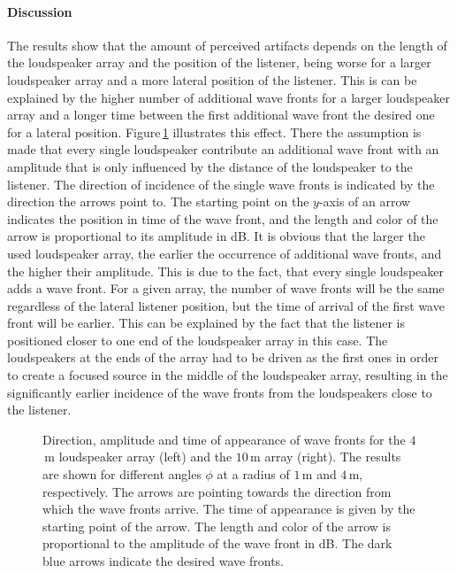 \paragraph{Discussion}
The results show that the amount of perceived artifacts depends on the length of
the loudspeaker array and the position of the listener, being worse for a larger
loudspeaker array and a more lateral position of the listener. This is can be
explained by the higher number of additional wave fronts for a larger
loudspeaker array and a longer time between the first additional wave front the
desired one for a lateral position. Figure\,\ref{fig:fs_direction} illustrates
this effect. There the assumption is made that every single loudspeaker
contribute an additional wave front with an amplitude that is only influenced by
the distance of the loudspeaker to the listener. The direction of incidence of
the single wave fronts is indicated by the direction the arrows point to.
The starting point on the $y$-axis of an arrow indicates the position in time
of the wave front, and the length and color of the arrow is proportional to
its amplitude in dB.
It is obvious that the larger the used
loudspeaker array, the earlier the occurrence of additional wave fronts, and the
higher their amplitude. This is due to the fact, that every single loudspeaker
adds a wave front.  For a given array, the number of wave fronts will be the
same regardless of the lateral listener position, but the time of arrival of the
first wave front will be earlier. This can be explained by the fact that the
listener is positioned closer to one end of the loudspeaker array in this case.
The loudspeakers at the ends of the array had to be driven as the first ones in
order to create a focused source in the middle of the loudspeaker array,
resulting in the significantly earlier incidence of the wave fronts from the
loudspeakers close to the listener.

\begin{figure}
    \centering
    \small
    
    \caption{Direction, amplitude and time of appearance of wave fronts for the
    $4$\,m loudspeaker array (left) and the $10$\,m array (right). The results
    are shown for different angles $\phi$ at a radius of $1$\,m and $4$\,m,
    respectively. The arrows are pointing towards
    the direction from which the wave fronts arrive. The
    time of appearance is given by the starting point of the arrow.
    The length and color of the arrow is proportional to the amplitude of the
    wave front in dB.
    The dark blue arrows indicate the desired wave fronts.
    }
    \label{fig:fs_direction}
\end{figure}


